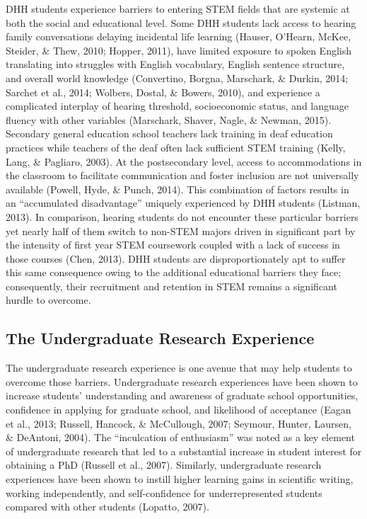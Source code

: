 \documentclass[11.5pt]{sig-alternate} %
\begin{document}
\begin{large}
DHH students experience barriers to entering STEM fields that are systemic at both the social and educational level. Some DHH students lack access to hearing family conversations delaying incidental life learning (Hauser, O’Hearn, McKee, Steider, \& Thew, 2010; Hopper, 2011), have limited exposure to spoken English translating into struggles with English vocabulary, English sentence structure, and overall world knowledge (Convertino, Borgna, Marschark, \& Durkin, 2014; Sarchet et al., 2014; Wolbers, Dostal, \& Bowers, 2010), and experience a complicated interplay of hearing threshold, socioeconomic status, and language fluency with other variables (Marschark, Shaver, Nagle, \& Newman, 2015). Secondary general education school teachers lack training in deaf education practices while teachers of the deaf often lack sufficient STEM training (Kelly, Lang, \& Pagliaro, 2003). At the postsecondary level, access to accommodations in the classroom to facilitate communication and foster inclusion are not universally available (Powell, Hyde, \& Punch, 2014). This combination of factors results in an “accumulated disadvantage” uniquely experienced by DHH students (Listman, 2013). In comparison, hearing students do not encounter these particular barriers yet nearly half of them switch to non-STEM majors driven in significant part by the intensity of first year STEM coursework coupled with a lack of success in those courses (Chen, 2013). DHH students are disproportionately apt to suffer this same consequence owing to the additional educational barriers they face; consequently, their recruitment and retention in STEM remains a significant hurdle to overcome.

\subsection*{The Undergraduate Research Experience}

The undergraduate research experience is one avenue that may help students to overcome those barriers. Undergraduate research experiences have been shown to increase students’ understanding and awareness of graduate school opportunities, confidence in applying for graduate school, and likelihood of acceptance (Eagan et al., 2013; Russell, Hancock, \& McCullough, 2007; Seymour, Hunter, Laursen, \& DeAntoni, 2004). The “inculcation of enthusiasm” was noted as a key element of undergraduate research that led to a substantial increase in student interest for obtaining a PhD (Russell et al., 2007). Similarly, undergraduate research experiences have been shown to instill higher learning gains in scientific writing, working independently, and self-confidence for underrepresented students compared with other students (Lopatto, 2007).


\end{large}
\end{document}
